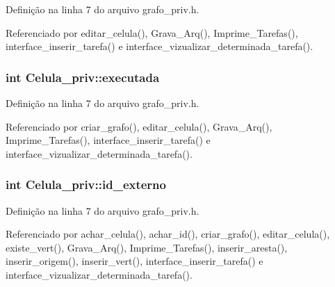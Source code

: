 Definição na linha 7 do arquivo grafo\+\_\+priv.\+h.



Referenciado por editar\+\_\+celula(), Grava\+\_\+\+Arq(), Imprime\+\_\+\+Tarefas(), interface\+\_\+inserir\+\_\+tarefa() e interface\+\_\+vizualizar\+\_\+determinada\+\_\+tarefa().

\hypertarget{structCelula__priv_af5f995caad41372e844f965021c5d183}{}
\subsubsection[{executada}]{\setlength{\rightskip}{0pt plus 5cm}int Celula\+\_\+priv\+::executada}\label{structCelula__priv_af5f995caad41372e844f965021c5d183}


Definição na linha 7 do arquivo grafo\+\_\+priv.\+h.



Referenciado por criar\+\_\+grafo(), editar\+\_\+celula(), Grava\+\_\+\+Arq(), Imprime\+\_\+\+Tarefas(), interface\+\_\+inserir\+\_\+tarefa() e interface\+\_\+vizualizar\+\_\+determinada\+\_\+tarefa().

\hypertarget{structCelula__priv_a78a8525da28e1918d0faaf127001bd7b}{}
\subsubsection[{id\+\_\+externo}]{\setlength{\rightskip}{0pt plus 5cm}int Celula\+\_\+priv\+::id\+\_\+externo}\label{structCelula__priv_a78a8525da28e1918d0faaf127001bd7b}


Definição na linha 7 do arquivo grafo\+\_\+priv.\+h.



Referenciado por achar\+\_\+celula(), achar\+\_\+id(), criar\+\_\+grafo(), editar\+\_\+celula(), existe\+\_\+vert(), Grava\+\_\+\+Arq(), Imprime\+\_\+\+Tarefas(), inserir\+\_\+aresta(), inserir\+\_\+origem(), inserir\+\_\+vert(), interface\+\_\+inserir\+\_\+tarefa() e interface\+\_\+vizualizar\+\_\+determinada\+\_\+tarefa().

\hypertarget{structCelula__priv_a3c49601fe078bd7bb1512f0107af5301}{}
